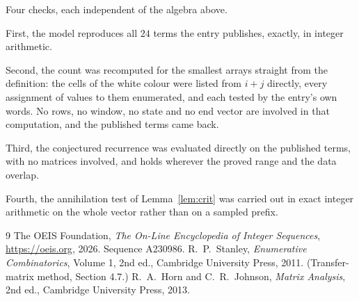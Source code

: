 \documentclass[11pt,a4paper]{article}
\theoremstyle{plain}
\theoremstyle{definition}
\begin{document}
Four checks, each independent of the algebra above.

First, the model reproduces all $24$ terms the entry publishes, exactly, in integer
arithmetic.

Second, the count was recomputed for the smallest arrays straight from the definition: the cells
of the white colour were listed from $i+j$ directly, every assignment of values to them
enumerated, and each tested by the entry's own words. No rows, no window, no state and no end
vector are involved in that computation, and the published terms came back.

Third, the conjectured recurrence was evaluated directly on the published terms, with no
matrices involved, and holds wherever the proved range and the data overlap.

Fourth, the annihilation test of Lemma~\ref{lem:crit} was carried out in exact integer
arithmetic on the whole vector rather than on a sampled prefix.

\begin{thebibliography}{9}
 The OEIS Foundation, \emph{The On-Line Encyclopedia of Integer
Sequences}, \url{https://oeis.org}, 2026. Sequence A230986.
 R.~P.~Stanley, \emph{Enumerative Combinatorics}, Volume 1, 2nd ed.,
Cambridge University Press, 2011. (Transfer-matrix method, Section 4.7.)
 R.~A.~Horn and C.~R.~Johnson, \emph{Matrix Analysis}, 2nd ed., Cambridge
University Press, 2013.
\end{thebibliography}
\end{document}
